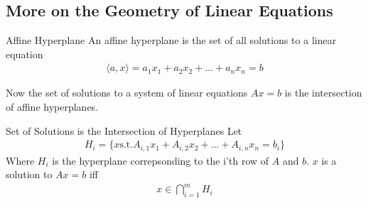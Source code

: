 \documentclass[11pt]{article}
\begin{document}
\subsection{More on the Geometry of Linear Equations}
\begin{definitionbox}{Affine Hyperplane}
    An affine hyperplane is the set of all solutions to a linear equation
    \begin{align*}
        \langle a,x \rangle = 
        a_1x_1 + a_2x_2 + ... + a_nx_n = b
    \end{align*}
\end{definitionbox}
Now the set of solutions to a system of linear equations $Ax=b$ is the intersection of affine hyperplanes.
\begin{theorembox}{Set of Solutions is the Intersection of Hyperplanes}
    Let
    \begin{align*}
        H_i = \{x \text{s.t.} A_{i,1}x_1 + A_{i,2}x_2 + ... + A_{i,n}x_n = b_i \}
    \end{align*}
    Where $H_i$ is the hyperplane correpsonding to the i'th row of $A$ and $b$. $x$ is a solution to $Ax=b$ iff 
    \begin{align*}
        x \in \bigcap_{i=1}^{m} H_i
    \end{align*}
\end{theorembox}
\end{document}
